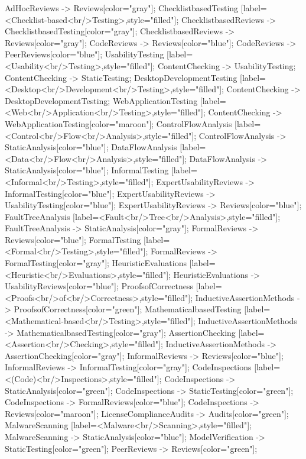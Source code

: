\documentclass{article}
\begin{document}
{AdHocReviews -> Reviews[color="gray"];
ChecklistbasedTesting [label=<Checklist-based<br/>Testing>,style="filled"];
ChecklistbasedReviews -> ChecklistbasedTesting[color="gray"];
ChecklistbasedReviews -> Reviews[color="gray"];
CodeReviews -> Reviews[color="blue"];
CodeReviews -> PeerReviews[color="blue"];
UsabilityTesting [label=<Usability<br/>Testing>,style="filled"];
ContentChecking -> UsabilityTesting;
ContentChecking -> StaticTesting;
DesktopDevelopmentTesting [label=<Desktop<br/>Development<br/>Testing>,style="filled"];
ContentChecking -> DesktopDevelopmentTesting;
WebApplicationTesting [label=<Web<br/>Application<br/>Testing>,style="filled"];
ContentChecking -> WebApplicationTesting[color="maroon"];
ControlFlowAnalysis [label=<Control<br/>Flow<br/>Analysis>,style="filled"];
ControlFlowAnalysis -> StaticAnalysis[color="blue"];
DataFlowAnalysis [label=<Data<br/>Flow<br/>Analysis>,style="filled"];
DataFlowAnalysis -> StaticAnalysis[color="blue"];
InformalTesting [label=<Informal<br/>Testing>,style="filled"];
ExpertUsabilityReviews -> InformalTesting[color="blue"];
ExpertUsabilityReviews -> UsabilityTesting[color="blue"];
ExpertUsabilityReviews -> Reviews[color="blue"];
FaultTreeAnalysis [label=<Fault<br/>Tree<br/>Analysis>,style="filled"];
FaultTreeAnalysis -> StaticAnalysis[color="gray"];
FormalReviews -> Reviews[color="blue"];
FormalTesting [label=<Formal<br/>Testing>,style="filled"];
FormalReviews -> FormalTesting[color="gray"];
HeuristicEvaluations [label=<Heuristic<br/>Evaluations>,style="filled"];
HeuristicEvaluations -> UsabilityReviews[color="blue"];
ProofsofCorrectness [label=<Proofs<br/>of<br/>Correctness>,style="filled"];
InductiveAssertionMethods -> ProofsofCorrectness[color="green"];
MathematicalbasedTesting [label=<Mathematical-based<br/>Testing>,style="filled"];
InductiveAssertionMethods -> MathematicalbasedTesting[color="gray"];
AssertionChecking [label=<Assertion<br/>Checking>,style="filled"];
InductiveAssertionMethods -> AssertionChecking[color="gray"];
InformalReviews -> Reviews[color="blue"];
InformalReviews -> InformalTesting[color="gray"];
CodeInspections [label=<(Code)<br/>Inspections>,style="filled"];
CodeInspections -> StaticAnalysis[color="green"];
CodeInspections -> StaticTesting[color="green"];
CodeInspections -> FormalReviews[color="blue"];
CodeInspections -> Reviews[color="maroon"];
LicenseComplianceAudits -> Audits[color="green"];
MalwareScanning [label=<Malware<br/>Scanning>,style="filled"];
MalwareScanning -> StaticAnalysis[color="blue"];
ModelVerification -> StaticTesting[color="green"];
PeerReviews -> Reviews[color="green"];
}
\end{document}
